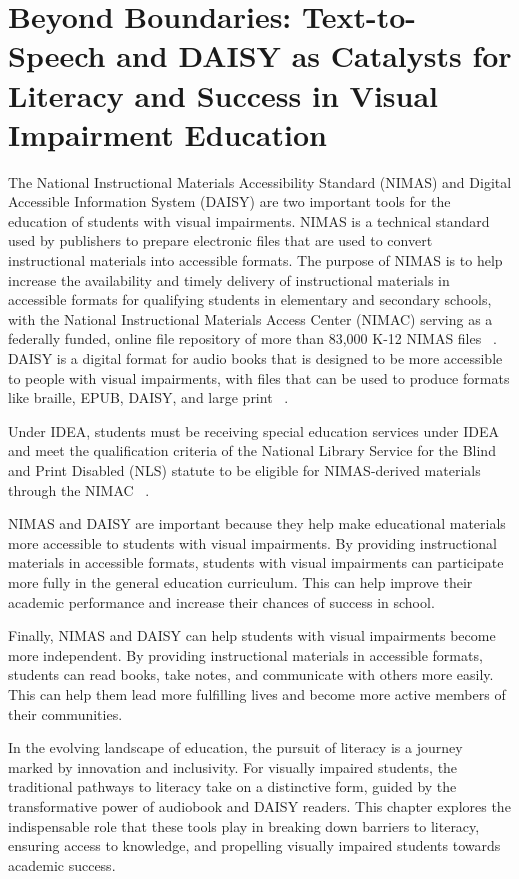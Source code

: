 \chapter{Beyond Boundaries: Text-to-Speech and DAISY as Catalysts for Literacy and Success in Visual Impairment Education}\label{chap:text-to-speech-daisy}

The National Instructional Materials Accessibility Standard (NIMAS) and Digital Accessible Information System (DAISY) are two important tools for the education of students with visual impairments. NIMAS is a technical standard used by publishers to prepare electronic files that are used to convert instructional materials into accessible formats. The purpose of NIMAS is to help increase the availability and timely delivery of instructional materials in accessible formats for qualifying students in elementary and secondary schools, with the National Instructional Materials Access Center (NIMAC) serving as a federally funded, online file repository of more than 83,000 K-12 NIMAS files~ \cite{NIMAC2025}. DAISY is a digital format for audio books that is designed to be more accessible to people with visual impairments, with files that can be used to produce formats like braille, EPUB, DAISY, and large print~ \cite{DAISY2024}.

Under IDEA, students must be receiving special education services under IDEA and meet the qualification criteria of the National Library Service for the Blind and Print Disabled (NLS) statute to be eligible for NIMAS-derived materials through the NIMAC~ \cite{CTEducation2025}.

NIMAS and DAISY are important because they help make educational materials more accessible to students with visual impairments. By providing instructional materials in accessible formats, students with visual impairments can participate more fully in the general education curriculum. This can help improve their academic performance and increase their chances of success in school.

Finally, NIMAS and DAISY can help students with visual impairments become more independent. By providing instructional materials in accessible formats, students can read books, take notes, and communicate with others more easily. This can help them lead more fulfilling lives and become more active members of their communities.

In the evolving landscape of education, the pursuit of literacy is a journey marked by innovation and inclusivity. For visually impaired students, the traditional pathways to literacy take on a distinctive form, guided by the transformative power of audiobook and DAISY readers. This chapter explores the indispensable role that these tools play in breaking down barriers to literacy, ensuring access to knowledge, and propelling visually impaired students towards academic success.

